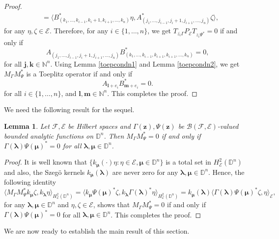 \documentclass[12pt]{amsart}
\newtheorem{lemma}[propn]{Lemma}
\theoremstyle{definition}
\newcommand{\Nat}{\mathbb{N}}
\newcommand{\D}{\mathbb{D}}
\newcommand{\1}{{\mbox{\bf 1}}}
\newcommand{\clb}{\mathcal{B}}
\newcommand{\cle}{\mathcal{E}}
\newcommand{\clf}{\mathcal{F}}
\begin{document}
\begin{proof}
\begin{align*}
&= \langle B_{(k_1,\ldots, k_{i-1}, k_i+1,k_{i+1}, \ldots, k_n)}^* \eta, A_{(j_1,\ldots, j_{i-1}, j_i+1,j_{i+1}, \ldots, j_n)}^* \zeta \rangle,
\end{align*}
for any $\eta, \zeta \in \cle$. Therefore, for any $i \in \{1,\ldots,n\}$, we get $T_{\overline{z_i} \Gamma} P_{\cle} T_{z_i \Psi^*}=0$ if and only if 
\[
A_{(j_1,\ldots, j_{i-1}, j_i+1,j_{i+1}, \ldots, j_n)} B_{(k_1,\ldots, k_{i-1}, k_{i+1},k_{i+1}, \ldots, k_n)}^* = 0,
\]
for all $\bm{j}, \bm{k} \in \Nat^n$. Using Lemma \ref{toepcondn1} and Lemma \ref{toepcondn2}, we get $M_{\Gamma}M_{\Psi}^*$ is a Toeplitz operator if and only if 
\[
A_{\bm{l}+e_{i}} B_{\bm{m}+e_i}^* = 0.
\]
for all $i \in \{1,\ldots,n\}$, and $\bm{l}, \bm{m} \in \Nat^n$.  
This completes the proof.
\end{proof}
We need the following result for the sequel.
\begin{lemma}\label{rule2}
Let $\clf, \cle$ be Hilbert spaces and $\Gamma(\bm{z}), \Psi(\bm{z})$ be $\clb(\clf,\cle)$-valued bounded analytic functions on $\D^n$.  Then $M_{\Gamma} M_{\Psi}^* = 0$ if and only if $\Gamma(\bm{\lambda}) \Psi(\bm{\mu})^* = 0$ for all $\bm{\lambda}, \bm{\mu} \in \D^n$.
\end{lemma}
\begin{proof}
It is well known that $\{k_{\bm{\mu}}(\cdot) \eta: \eta \in \cle, \bm{\mu} \in \D^n\}$ is a total set in $H_{\cle}^2(\D^n)$ and also, the Szeg\"o kernels $k_{\bm{\mu}}(\bm{\lambda})$ are never zero for any $\bm{\lambda}, \bm{\mu} \in \D^n$. Hence, the following identity
\[
\langle M_{\Gamma} M_{\Psi}^* k_{\bm{\mu}} \zeta, k_{\bm{\lambda}} \eta \rangle_{H_{\cle}^2(\D^n)} = \langle k_{\bm{\mu}} \Psi(\bm{\mu})^* \zeta, k_{\bm{\lambda}} \Gamma(\bm{\lambda})^* \eta \rangle_{H_{\cle}^2(\D^n)} = k_{\bm{\mu}}(\bm{\lambda}) \langle \Gamma(\bm{\lambda}) \Psi(\bm{\mu})^* \zeta,  \eta \rangle_{\cle},
\]
for any $\bm{\lambda}, \bm{\mu} \in \D^n$ and $\eta, \zeta \in \cle$, shows that $M_{\Gamma} M_{\Psi}^* = 0$ if and only if $ \Gamma(\bm{\lambda}) \Psi(\bm{\mu})^* = 0$ for all $\bm{\lambda}, \bm{\mu} \in \D^n$. This completes the proof.
\end{proof}
We are now ready to establish the main result of this section.
\end{document}
